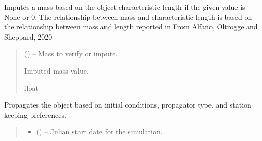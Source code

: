 \documentclass[letterpaper,10pt,english]{sphinxmanual}
\begin{document}
\begin{fulllineitems}
\begin{fulllineitems}
\label{\detokenize{fspsim.utils:fspsim.utils.SpaceObject.SpaceObject.impute_mass}}
\pysigstartsignatures
{}
\pysigstopsignatures
\sphinxAtStartPar
Imputes a mass based on the object characteristic length if the given value is None or 0.
The relationship between mass and characteristic length is based on the relationship between mass and length reported in From Alfano, Oltrogge and Sheppard, 2020
\begin{quote}\begin{description}
\sphinxAtStartPar
{} () – Mass to verify or impute.

\sphinxAtStartPar
Imputed mass value.

\sphinxAtStartPar
float

\end{description}\end{quote}

\end{fulllineitems}


\begin{fulllineitems}
\label{\detokenize{fspsim.utils:fspsim.utils.SpaceObject.SpaceObject.prop_catobject}}
\pysigstartsignatures
{}
\pysigstopsignatures
\sphinxAtStartPar
Propagates the object based on initial conditions, propagator type, and station keeping preferences.
\begin{quote}\begin{description}
\begin{itemize}
\item {} 
\sphinxAtStartPar
{} () – Julian start date for the simulation.


\end{itemize}
\end{description}
\end{quote}
\end{fulllineitems}
\end{fulllineitems}
\end{document}
